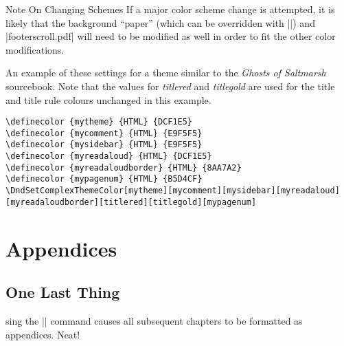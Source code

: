\documentclass[letterpaper,twocolumn,openany,nodeprecatedcode]{dndbook}
\begin{document}
\begin{DndComment}{Note On Changing Schemes}
If a major color scheme change is attempted, it is
likely that the background ``paper'' (which can be overridden with
|\SetPaperImage|) and |footerscroll.pdf| will need
to be modified as well in order to fit the other color modifications.
\end{DndComment}

An example of these settings for a theme similar to the \textit{Ghosts of Saltmarsh} sourcebook. Note that the values for \textit{titlered} and \textit{titlegold} are used for the title and title rule colours unchanged in this example.

\begin{lstlisting}[basicstyle=\ttfamily\small]
\definecolor {mytheme} {HTML} {DCF1E5}
\definecolor {mycomment} {HTML} {E9F5F5}
\definecolor {mysidebar} {HTML} {E9F5F5}
\definecolor {myreadaloud} {HTML} {DCF1E5}
\definecolor {myreadaloudborder} {HTML} {8AA7A2}
\definecolor {mypagenum} {HTML} {B5D4CF}
\DndSetComplexThemeColor[mytheme][mycomment][mysidebar][myreadaloud][myreadaloudborder][titlered][titlegold][mypagenum]
\end{lstlisting}

\part{Appendices}

\appendix

\chapter{One Last Thing}

sing the |\appendix| command causes all subsequent chapters to be formatted as appendices. Neat!
\end{document}
